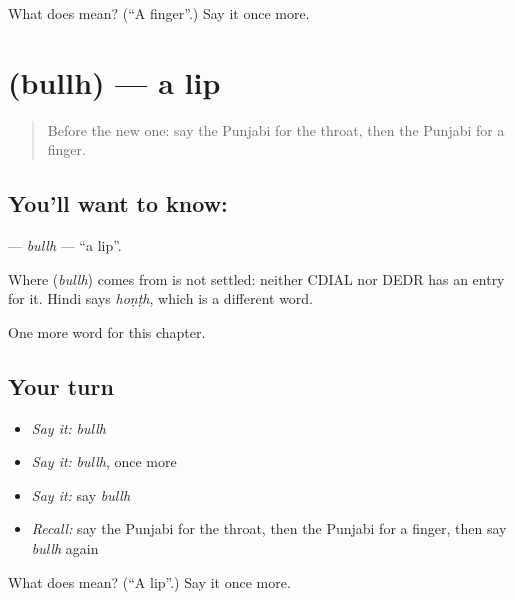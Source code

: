 \begin{tcolorbox}[breakable,colback=teal!4,colframe=teal!35!black,title={Before you move on}]
What does  mean? (\textquotedblleft{}A finger\textquotedblright{}.) Say it once more.
\end{tcolorbox}
\section[\texorpdfstring{\pa{ਬੁੱਲ੍ਹ} (bullh)}{ਬੁੱਲ੍ਹ (bullh)}]{ (bullh) — a lip}

\label{lesson:PA-C50-bullh}



\begin{quote}
Before the new one: say the Punjabi for the throat, then the Punjabi for a finger.
\end{quote}

\subsection*{You'll want to know: }
\textbf{} — \emph{bullh} — \textquotedblleft{}a lip\textquotedblright{}.

\begin{cousinweb}
Where \textbf{} (\emph{bullh}) comes from is not settled: neither CDIAL nor DEDR has an entry for it. Hindi says \emph{hoṇṭh}, which is a different word.
\end{cousinweb}

\begin{grammarlens}[title={What you've built}]
One more word for this chapter.
\end{grammarlens}

\subsection*{Your turn}
\begin{itemize}
\raggedright
  \item \emph{Say it:} \emph{bullh}
  \item \emph{Say it:} \emph{bullh}, once more
  \item \emph{Say it:} say \emph{bullh}
  \item \emph{Recall:} say the Punjabi for the throat, then the Punjabi for a finger, then say \emph{bullh} again
\end{itemize}

\begin{tcolorbox}[breakable,colback=teal!4,colframe=teal!35!black,title={Before you move on}]
What does  mean? (\textquotedblleft{}A lip\textquotedblright{}.) Say it once more.
\end{tcolorbox}
